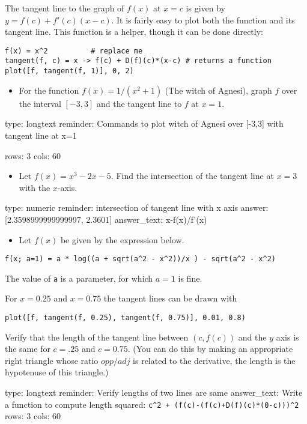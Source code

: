\documentclass[12pt]{article}
\begin{document}
The tangent line to the graph of $f(x)$ at $x=c$ is given by
$y = f(c) + f'(c)(x-c)$. It is fairly easy to plot both the function and
its tangent line. This function is a helper, though it can be done
directly:



\begin{verbatim}
f(x) = x^2          # replace me
tangent(f, c) = x -> f(c) + D(f)(c)*(x-c) # returns a function
plot([f, tangent(f, 1)], 0, 2)
\end{verbatim}
\begin{itemize}
\itemsep1pt\parskip0pt
\item
  For the function $f(x) = 1/(x^2 + 1)$ (The witch of Agnesi), graph $f$
  over the interval $[-3,3]$ and the tangent line to $f$ at $x=1$.
\end{itemize}

\begin{answer}
type: longtext
reminder: Commands to plot witch of Agnesi over [-3,3] with tangent line at x=1

rows: 3
cols: 60
\end{answer}

\begin{itemize}
\itemsep1pt\parskip0pt
\item
  Let $f(x) = x^3 -2x - 5$. Find the intersection of the tangent line at
  $x=3$ with the $x$-axis.
\end{itemize}

\begin{answer}
    type: numeric
    reminder: intersection of tangent line with x axis
    answer: [2.3598999999999997, 2.3601]
answer_text: x-f(x)/f'(x) 
\end{answer}

\begin{itemize}
\itemsep1pt\parskip0pt
\item
  Let $f(x)$ be given by the expression below.
\end{itemize}



\begin{verbatim}
f(x; a=1) = a * log((a + sqrt(a^2 - x^2))/x ) - sqrt(a^2 - x^2)
\end{verbatim}
The value of \texttt{a} is a parameter, for which $a=1$ is fine.

For $x=0.25$ and $x=0.75$ the tangent lines can be drawn with



\begin{verbatim}
plot([f, tangent(f, 0.25), tangent(f, 0.75)], 0.01, 0.8)
\end{verbatim}
Verify that the length of the tangent line between $(c, f(c))$ and the
$y$ axis is the same for $c=.25$ and $c=0.75$. (You can do this by
making an appropriate right triangle whose ratio $opp/adj$ is related to
the derivative, the length is the hypotenuse of this triangle.)

\begin{answer}
type: longtext
reminder: Verify lengths of two lines are same
answer_text: Write a function to compute length squared: \verb#c^2 + (f(c)-(f(c)+D(f)(c)*(0-c)))^2# 
rows: 3
cols: 60
\end{answer}
\end{document}
